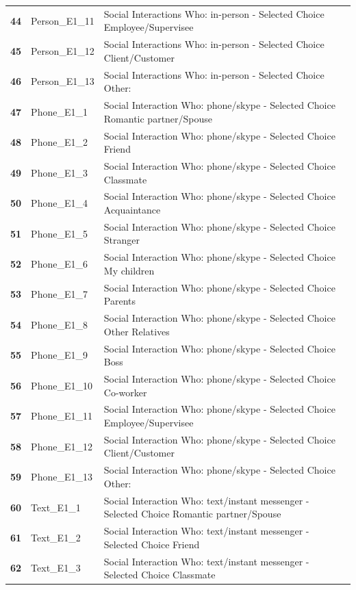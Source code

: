 \documentclass[
  letterpaper,
  DIV=11,
  numbers=noendperiod]{scrartcl}
\begin{document}
\begin{longtable}[t]{>{}cll}
\textbf{44} & Person\_E1\_11 & Social Interactions Who: in-person - Selected Choice Employee/Supervisee\\
\textbf{45} & Person\_E1\_12 & Social Interactions Who: in-person - Selected Choice Client/Customer\\
\addlinespace
\textbf{46} & Person\_E1\_13 & Social Interactions Who: in-person - Selected Choice Other:\\
\textbf{47} & Phone\_E1\_1 & Social Interaction Who: phone/skype - Selected Choice Romantic partner/Spouse\\
\textbf{48} & Phone\_E1\_2 & Social Interaction Who: phone/skype - Selected Choice Friend\\
\textbf{49} & Phone\_E1\_3 & Social Interaction Who: phone/skype - Selected Choice Classmate\\
\textbf{50} & Phone\_E1\_4 & Social Interaction Who: phone/skype - Selected Choice Acquaintance\\
\addlinespace
\textbf{51} & Phone\_E1\_5 & Social Interaction Who: phone/skype - Selected Choice Stranger\\
\textbf{52} & Phone\_E1\_6 & Social Interaction Who: phone/skype - Selected Choice My children\\
\textbf{53} & Phone\_E1\_7 & Social Interaction Who: phone/skype - Selected Choice Parents\\
\textbf{54} & Phone\_E1\_8 & Social Interaction Who: phone/skype - Selected Choice Other Relatives\\
\textbf{55} & Phone\_E1\_9 & Social Interaction Who: phone/skype - Selected Choice Boss\\
\addlinespace
\textbf{56} & Phone\_E1\_10 & Social Interaction Who: phone/skype - Selected Choice Co-worker\\
\textbf{57} & Phone\_E1\_11 & Social Interaction Who: phone/skype - Selected Choice Employee/Supervisee\\
\textbf{58} & Phone\_E1\_12 & Social Interaction Who: phone/skype - Selected Choice Client/Customer\\
\textbf{59} & Phone\_E1\_13 & Social Interaction Who: phone/skype - Selected Choice Other:\\
\textbf{60} & Text\_E1\_1 & Social Interaction Who: text/instant messenger - Selected Choice Romantic partner/Spouse\\
\addlinespace
\textbf{61} & Text\_E1\_2 & Social Interaction Who: text/instant messenger - Selected Choice Friend\\
\textbf{62} & Text\_E1\_3 & Social Interaction Who: text/instant messenger - Selected Choice Classmate\\

\end{longtable}
\end{document}
